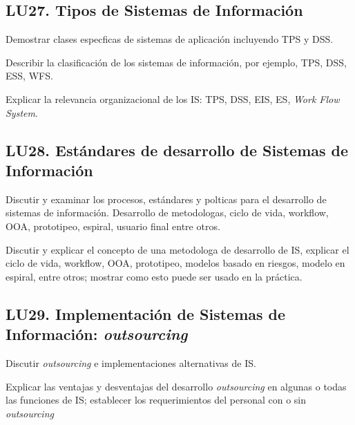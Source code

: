 \subsection{LU27. Tipos de Sistemas de Información}\label{sec:LU27}
\begin{LearningUnit}
\begin{LUGoal}
\item Demostrar clases espec­ficas de sistemas de aplicación incluyendo TPS y DSS.
\end{LUGoal}

\begin{LUObjective}
\item Describir la clasificación de los sistemas de información, por  ejemplo, TPS, DSS, ESS, WFS.
\item Explicar la relevancia organizacional de los IS: TPS, DSS, EIS, ES, {\it Work Flow System}.
\end{LUObjective}
\end{LearningUnit}

\subsection{LU28. Estándares de desarrollo de Sistemas de Información}\label{sec:LU28}
\begin{LearningUnit}
\begin{LUGoal}
\item Discutir  y examinar los procesos, estándares y pol­ticas para el desarrollo de sistemas de información. Desarrollo de metodolog­as, ciclo de vida, workflow, OOA, prototipeo, espiral, usuario final entre otros.
\end{LUGoal}

\begin{LUObjective}
\item Discutir y explicar el concepto de una metodolog­a de desarrollo de IS, explicar el ciclo de vida, workflow, OOA, prototipeo, modelos basado en riesgos, modelo en espiral, entre otros; mostrar como esto puede ser usado en la práctica.   
\end{LUObjective}
\end{LearningUnit}

\subsection{LU29. Implementación de Sistemas de Información: \textit{outsourcing}}\label{sec:LU29}
\begin{LearningUnit}
\begin{LUGoal}
\item Discutir {\it outsourcing} e implementaciones alternativas de IS.
\end{LUGoal}

\begin{LUObjective}
\item Explicar las ventajas  y desventajas del desarrollo {\it outsourcing} en algunas o todas las funciones de IS; establecer  los requerimientos del personal con o sin {\it outsourcing}
\end{LUObjective}
\end{LearningUnit}

